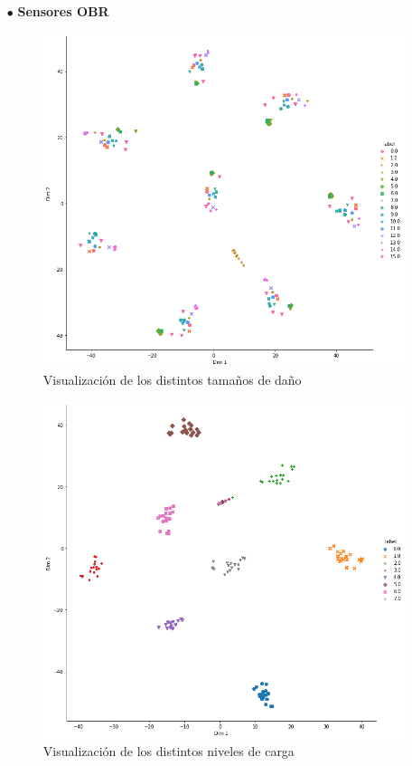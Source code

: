\begin{itemize}
	\item[$\bullet$] \textbf{Sensores OBR}    
    
    \begin{figure}[H]
        \centering
        \includegraphics[width=125mm]{3/Fotos/tsne_Ty_Si_OBR_INESASSE.png}
        \captionsetup{justification=centering,margin=1.25cm}
        \caption{Visualización de los distintos tamaños de daño}
        \label{fig:tsne_OBR_Ty_Si}
    \end{figure}  
    
    \begin{figure}[H]
        \centering
        \includegraphics[width=125mm]{3/Fotos/tsne_Load_OBR_INESASSE.png}
        \captionsetup{justification=centering,margin=1.25cm}
        \caption{Visualización de los distintos niveles de carga}
        \label{fig:tsne_OBR_Load}
    \end{figure}      
    
    
\end{itemize}

